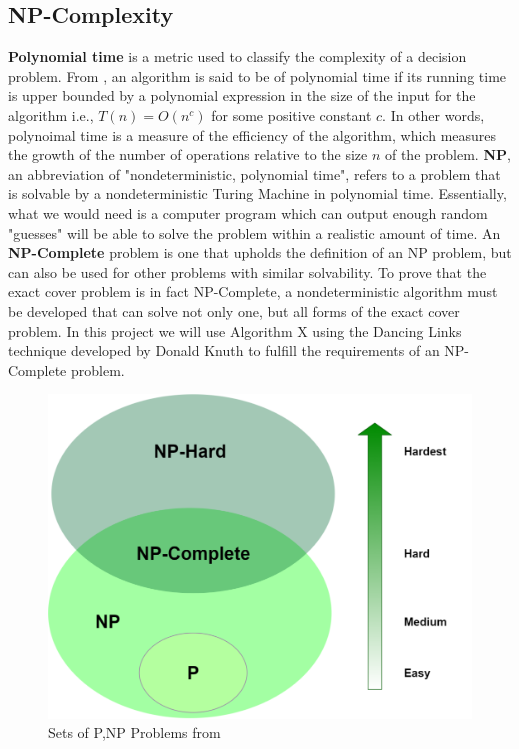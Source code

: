\documentclass{article}
\begin{document}
\subsection{NP-Complexity}
\textbf{Polynomial time} is a metric used to classify the complexity of a decision problem. From \cite{npcomplete}, an algorithm is said to be of polynomial time if its running time is upper bounded by a polynomial expression in the size of the input for the algorithm i.e., $T(n) = O(n^c)$ for some positive constant $c$. In other words, polynoimal time is a measure of the efficiency of the algorithm, which measures the growth of the number of operations relative to the size $n$ of the problem. \textbf{NP}, an abbreviation of "nondeterministic, polynomial time", refers to a problem that is solvable by a nondeterministic Turing Machine in polynomial time. Essentially, what we would need is a computer program which can output enough random "guesses" will be able to solve the problem within a realistic amount of time. An \textbf{NP-Complete} problem is one that upholds the definition of an NP problem, but can also be used for other problems with similar solvability. To prove that the exact cover problem is in fact NP-Complete, a nondeterministic algorithm must be developed that can solve not only one, but all forms of the exact cover problem. In this project we will use Algorithm X using the Dancing Links technique developed by Donald Knuth to fulfill the requirements of an NP-Complete problem.
\begin{center}
\begin{figure}[ht]
\includegraphics[scale=0.35]{images/np.png}
\caption{Sets of P,NP Problems from \cite{npfig}}
\label{fig: np}
\end{figure}
\end{center}
\end{document}
